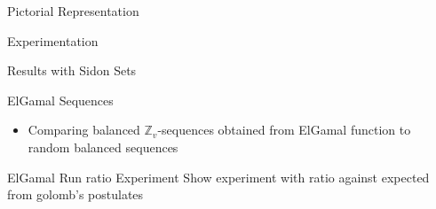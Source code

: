 \begin{frame}{Pictorial Representation}
\end{frame}

\begin{frame}{Experimentation}
\end{frame}

\begin{frame}{Results with Sidon Sets}
\end{frame}

\begin{frame}{ElGamal Sequences}
    \begin{itemize}
        \item Comparing balanced $\mathbb{Z}_v$-sequences obtained from ElGamal function to random balanced sequences~\cite{elgamalsequences}
    \end{itemize}
\end{frame}


\begin{frame}{ElGamal Run ratio Experiment}
    Show experiment with ratio against expected from golomb's postulates
\end{frame}
